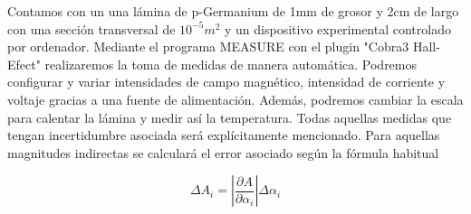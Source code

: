 Contamos con un una lámina de p-Germanium de 1mm de grosor y 2cm de largo con una sección transversal de $10^{-5}m^2$ y un dispositivo experimental controlado por ordenador. Mediante el programa MEASURE con el plugin "Cobra3 Hall-Efect" realizaremos la toma de medidas de manera automática. Podremos configurar y variar intensidades de campo magnético, intensidad de corriente y voltaje gracias a una fuente de alimentación. Además, podremos cambiar la escala para calentar la lámina y medir así la temperatura. Todas aquellas medidas que tengan incertidumbre asociada será explícitamente mencionado. Para aquellas magnitudes indirectas se calculará el error asociado según la fórmula habitual

\begin{equation}
	\Delta{A_i} = |\frac{\partial A}{\partial \alpha_i}|\Delta \alpha_i
\end{equation}
